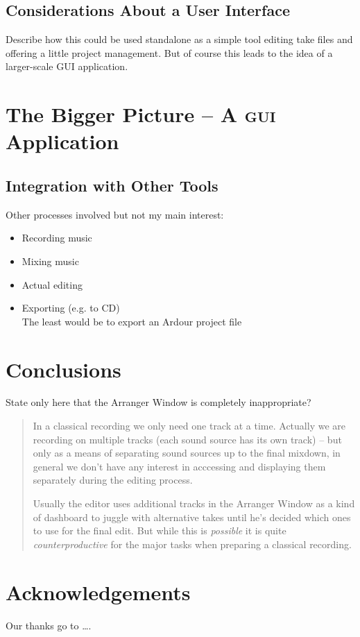\documentclass[11pt,a4paper]{article}
\begin{document}
\subsection{Considerations About a User Interface}

Describe how this could be used standalone as a simple tool editing take files and offering a little project management.
But of course this leads to the idea of a larger-scale GUI application.

\section{The Bigger Picture -- A \textsc{gui} Application}

\subsection{Integration with Other Tools}

Other processes involved but not my main interest:

\begin{itemize}
\item Recording music
\item Mixing music
\item Actual editing
\item Exporting (e.g. to CD)\\
	The least would be to export an Ardour project file
\end{itemize}

\section{Conclusions}

State only here that the Arranger Window is completely inappropriate?

\begin{quote}


In a classical recording we only need one track at a time.
Actually we are recording on multiple tracks (each sound source has its own track) -- but only as a means of separating sound sources up to the final mixdown, in general we don't have any interest in acccessing and displaying them separately during the editing process.

Usually the editor uses additional tracks in the Arranger Window as a kind of dashboard to juggle with alternative takes until he's decided which ones to use for the final edit.
But while this is \emph{possible} it is quite \emph{counterproductive} for the major tasks when preparing a classical recording.
\end{quote}

\section{Acknowledgements}

Our thanks go to \ldots .
\end{document}

